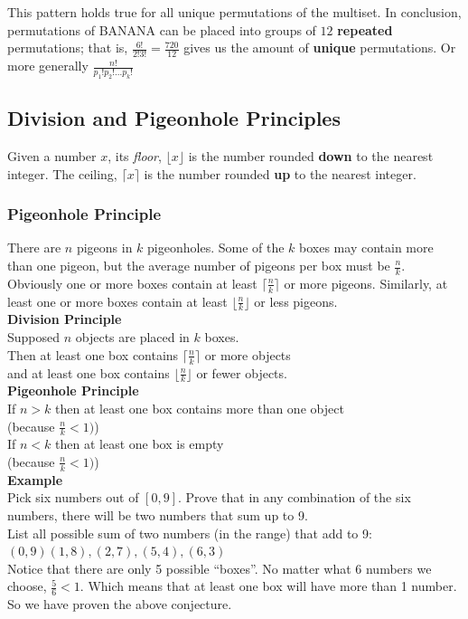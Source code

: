 \documentclass[a4paper,11pt]{article}
\begin{document}
This pattern holds true for all unique permutations of the multiset. In conclusion, permutations of BANANA can be placed into groups of $12$ \textbf{repeated} permutations; that is, $\frac{6!}{2!3!}=\frac{720}{12}$ gives us the amount of \textbf{unique} permutations. Or more generally $\frac{n!}{p_1!p_2!...p_k!}$

\subsection{Division and Pigeonhole Principles}
Given a number $x$, its \textit{floor}, $\lfloor x \rfloor$ is the number rounded \textbf{down} to the nearest integer. The ceiling, $\lceil x \rceil$ is the number rounded \textbf{up} to the nearest integer.
\subsubsection{Pigeonhole Principle}
There are $n$ pigeons in $k$ pigeonholes. Some of the $k$ boxes may contain more than one pigeon, but the average number of pigeons per box must be $\frac{n}{k}$.
Obviously one or more boxes contain at least $\lceil \frac{n}{k} \rceil$ or more pigeons. Similarly, at least one or more boxes contain at least $\lfloor \frac{n}{k} \rfloor$ or less pigeons.\vspace{5pt}\\
\textbf{Division Principle}\\
Supposed $n$ objects are placed in $k$ boxes.\\
Then at least one box contains $\lceil \frac{n}{k} \rceil$ or more objects\\
and at least one box contains $\lfloor \frac{n}{k} \rfloor$ or fewer objects.\vspace{5pt}\\
\textbf{Pigeonhole Principle}\\
If $n>k$ then at least one box contains more than one object\\
\hspace*{10pt}(because $\frac{n}{k} < 1)$)\\
If $n<k$ then at least one box is empty\\
\hspace*{10pt}(because $\frac{n}{k} < 1)$)\vspace{5pt}\\
\textbf{Example}\\
Pick six numbers out of $[0,9]$. Prove that in any combination of the six numbers, there will be two numbers that sum up to 9.\\
List all possible sum of two numbers (in the range) that add to 9:\\
$(0,9)(1,8),(2,7),(5,4),(6,3)$\\
Notice that there are only 5 possible ``boxes''. No matter what 6 numbers we choose, $\frac{5}{6} < 1$. Which means that at least one box will have more than 1 number. So we have proven the above conjecture.
\end{document}
